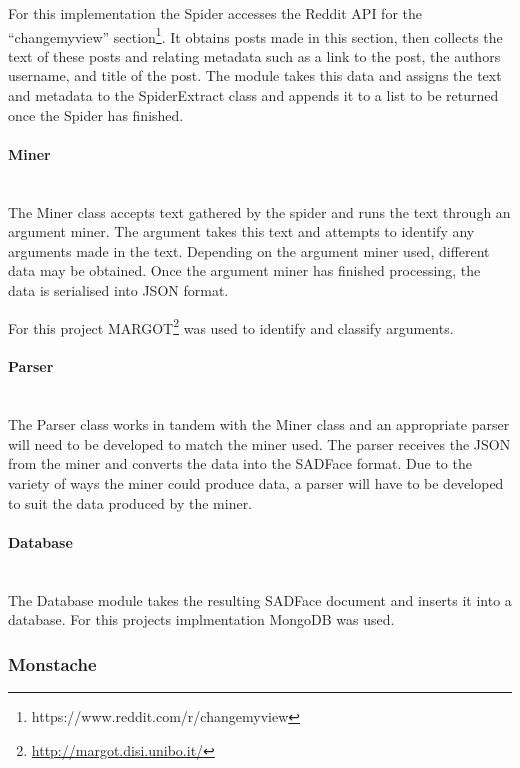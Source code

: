 \documentclass[12pt,a4paper]{article}
\begin{document}
For this implementation the Spider accesses the Reddit API for the ``changemyview'' section\footnote{https://www.reddit.com/r/changemyview}. It obtains posts made in this section, then collects the text of these posts and relating metadata such as a link to the post, the authors username, and title of the post. The module takes this data and assigns the text and metadata to the SpiderExtract class and appends it to a list to be returned once the Spider has finished. 

\paragraph{Miner}\mbox{}\\

The Miner class accepts text gathered by the spider and runs the text through an argument miner. The argument takes this text and attempts to identify any arguments made in the text. Depending on the argument miner used, different data may be obtained. Once the argument miner has finished processing, the data is serialised into JSON format.

For this project MARGOT\footnote{\url{http://margot.disi.unibo.it/}} was used to identify and classify arguments.

\paragraph{Parser}\mbox{}\\

The Parser class works in tandem with the Miner class and an appropriate parser will need to be developed to match the miner used. The parser receives the JSON from the miner and converts the data into the SADFace format. Due to the variety of ways the miner could produce data, a parser will have to be developed to suit the data produced by the miner.

\paragraph{Database}\mbox{}\\

The Database module takes the resulting SADFace document and inserts it into a database. For this projects implmentation MongoDB was used.

\subsubsection{Monstache}
\end{document}
